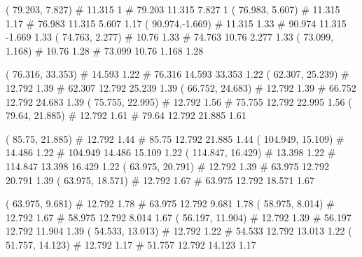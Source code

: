 \documentclass[a4paper,openbib,10pt]{article}
\newenvironment{treegraph}{\begin{graph}}{\end{graph}}
\begin{document}
\begin{treegraph}
  ( 79.203, 7.827) #     11.315    1
   #    79.203    11.315    7.827    1
  ( 76.983, 5.607) #     11.315    1.17
   #    76.983    11.315    5.607    1.17
  ( 90.974,-1.669) #     11.315    1.33
   #    90.974    11.315    -1.669    1.33
  ( 74.763, 2.277) #     10.76    1.33
   #    74.763    10.76    2.277    1.33
  ( 73.099, 1.168) #     10.76    1.28
   #    73.099    10.76    1.168    1.28

  ( 76.316, 33.353) #     14.593    1.22
   #    76.316    14.593    33.353    1.22
  ( 62.307, 25.239) #     12.792    1.39
   #    62.307    12.792    25.239    1.39
  ( 66.752, 24.683) #     12.792    1.39
   #    66.752    12.792    24.683    1.39
  ( 75.755, 22.995) #     12.792    1.56
   #    75.755    12.792    22.995    1.56
  ( 79.64, 21.885) #     12.792    1.61
   #    79.64    12.792    21.885    1.61

  ( 85.75, 21.885) #     12.792    1.44
   #    85.75    12.792    21.885    1.44
  ( 104.949, 15.109) #     14.486    1.22
   #    104.949    14.486    15.109    1.22
  ( 114.847, 16.429) #     13.398    1.22
   #    114.847    13.398    16.429    1.22
  ( 63.975, 20.791) #     12.792    1.39
   #    63.975    12.792    20.791    1.39
  ( 63.975, 18.571) #     12.792    1.67
   #    63.975    12.792    18.571    1.67

  ( 63.975, 9.681) #     12.792    1.78
   #    63.975    12.792    9.681    1.78
  ( 58.975, 8.014) #     12.792    1.67
   #    58.975    12.792    8.014    1.67
  ( 56.197, 11.904) #     12.792    1.39
   #    56.197    12.792    11.904    1.39
  ( 54.533, 13.013) #     12.792    1.22
   #    54.533    12.792    13.013    1.22
  ( 51.757, 14.123) #     12.792    1.17
   #    51.757    12.792    14.123    1.17


\end{treegraph}
\end{document}
